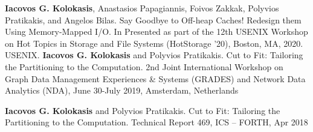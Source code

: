 



\begin{cventries}
\vspace{-15pt}
  \cventry
    {}
    {}
    {}
    {}
    {\textbf{Iacovos G. Kolokasis}, Anastasios Papagiannis, Foivos
    Zakkak, Polyvios Pratikakis, and Angelos Bilas.%
    Say Goodbye to Off-heap Caches! Redesign them Using Memory-Mapped
    I/O. In Presented as part of the 12th USENIX Workshop on Hot
    Topics in Storage and File Systems (HotStorage '20), Boston, MA, 2020. USENIX.}
  {}
  \cventry
    {}
    {}
    {}
    {}
    {\textbf{Iacovos G. Kolokasis} and Polyvios
  Pratikakis. Cut to Fit: Tailoring the Partitioning to the
  Computation. 2nd Joint International Workshop on Graph Data
  Management Experiences \& Systems (GRADES) and Network Data
  Analytics (NDA), June 30-July 2019, Amsterdam, Netherlands}
  {}

\end{cventries}
      

\vspace{-15pt}
\begin{cventries}

  \cventry
    {}
    {}
    {}
    {}
    {\textbf{Iacovos G. Kolokasis} and Polyvios Pratikakis.
      Cut to Fit: Tailoring the Partitioning to the Computation.
      Technical Report 469, ICS -- FORTH, Apr 2018 }{}%


\end{cventries}
